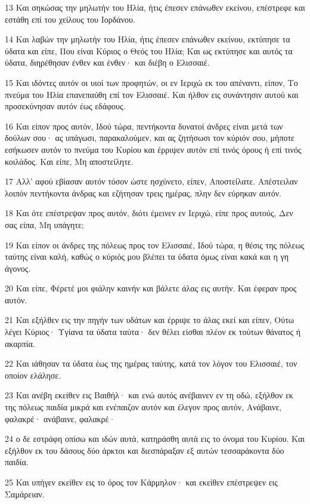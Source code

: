 \par 13 Και σηκώσας την μηλωτήν του Ηλία, ήτις έπεσεν επάνωθεν εκείνου, επέστρεφε και εστάθη επί του χείλους του Ιορδάνου.
\par 14 Και λαβών την μηλωτήν του Ηλία, ήτις έπεσεν επάνωθεν εκείνου, εκτύπησε τα ύδατα και είπε, Που είναι Κύριος ο Θεός του Ηλία; Και ως εκτύπησε και αυτός τα ύδατα, διηρέθησαν ένθεν και ένθεν· και διέβη ο Ελισσαιέ.
\par 15 Και ιδόντες αυτόν οι υιοί των προφητών, οι εν Ιεριχώ εκ του απέναντι, είπον, Το πνεύμα του Ηλία επανεπαύθη επί τον Ελισσαιέ. Και ήλθον εις συνάντησιν αυτού και προσεκύνησαν αυτόν έως εδάφους.
\par 16 Και είπον προς αυτόν, Ιδού τώρα, πεντήκοντα δυνατοί άνδρες είναι μετά των δούλων σου· ας υπάγωσι, παρακαλούμεν, και ας ζητήσωσι τον κύριόν σου, μήποτε εσήκωσεν αυτόν το πνεύμα του Κυρίου και έρριψεν αυτόν επί τινός όρους ή επί τινός κοιλάδος. Και είπε, Μη αποστείλητε.
\par 17 Αλλ' αφού εβίασαν αυτόν τόσον ώστε ησχύνετο, είπεν, Αποστείλατε. Απέστειλαν λοιπόν πεντήκοντα άνδρας και εζήτησαν τρεις ημέρας, πλην δεν εύρηκαν αυτόν.
\par 18 Και ότε επέστρεψαν προς αυτόν, διότι έμεινεν εν Ιεριχώ, είπε προς αυτούς, Δεν σας είπα, Μη υπάγητε;
\par 19 Και είπον οι άνδρες της πόλεως προς τον Ελισσαιέ, Ιδού τώρα, η θέσις της πόλεως ταύτης είναι καλή, καθώς ο κύριός μου βλέπει τα ύδατα όμως είναι κακά και η γη άγονος.
\par 20 Και είπε, Φέρετέ μοι φιάλην καινήν και βάλετε άλας εις αυτήν. Και έφεραν προς αυτόν.
\par 21 Και εξήλθεν εις την πηγήν των υδάτων και έρριψε το άλας εκεί και είπεν, Ούτω λέγει Κύριος· Υγίανα τα ύδατα ταύτα· δεν θέλει είσθαι πλέον εκ τούτων θάνατος ή ακαρπία.
\par 22 Και ιάθησαν τα ύδατα έως της ημέρας ταύτης, κατά τον λόγον του Ελισσαιέ, τον οποίον ελάλησε.
\par 23 Και ανέβη εκείθεν εις Βαιθήλ· και ενώ αυτός ανέβαινεν εν τη οδώ, εξήλθον εκ της πόλεως παιδία μικρά και ενέπαιζον αυτόν και έλεγον προς αυτόν, Ανάβαινε, φαλακρέ· ανάβαινε, φαλακρέ·
\par 24 ο δε εστράφη οπίσω και ιδών αυτά, κατηράσθη αυτά εις το όνομα του Κυρίου. Και εξήλθον εκ του δάσους δύο άρκτοι και διεσπάραξαν εξ αυτών τεσσαράκοντα δύο παιδία.
\par 25 Και υπήγεν εκείθεν εις το όρος τον Κάρμηλον· και εκείθεν επέστρεψεν εις Σαμάρειαν.

